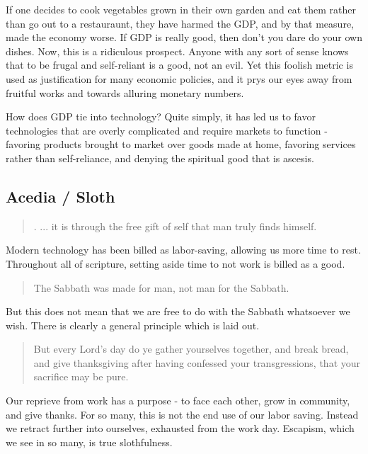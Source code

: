 \documentclass[letterpaper]{article}
\begin{document}
If one decides to cook vegetables grown in their own garden and eat them rather than go out to a restauraunt, they have harmed the GDP, and by that measure, made the economy worse. If GDP is really good, then don't you dare do your own dishes. Now, this is a ridiculous prospect. Anyone with any sort of sense knows that to be frugal and self-reliant is a good, not an evil. Yet this foolish metric is used as justification for many economic policies, and it prys our eyes away from fruitful works and towards alluring monetary numbers.

How does GDP tie into technology? Quite simply, it has led us to favor technologies that are overly complicated and require markets to function - favoring products brought to market over goods made at home, favoring services rather than self-reliance, and denying the spiritual good that is ascesis.


\subsection{Acedia / Sloth}

\begin{quote}.
  ... it is through the free gift of self that man truly finds himself.
\end{quote}

Modern technology has been billed as labor-saving, allowing us more time to rest. Throughout all of scripture, setting aside time to not work is billed as a good.

\begin{quote}
  The Sabbath was made for man, not man for the Sabbath.
\end{quote}

But this does not mean that we are free to do with the Sabbath whatsoever we wish. There is clearly a general principle which is laid out.

\begin{quote}
  But every Lord's day do ye gather yourselves together, and break bread, and give thanksgiving after having confessed your transgressions, that your sacrifice may be pure.
\end{quote}

Our reprieve from work has a purpose - to face each other, grow in community, and give thanks. For so many, this is not the end use of our labor saving. Instead we retract further into ourselves, exhausted from the work day. Escapism, which we see in so many, is true slothfulness.
\end{document}
